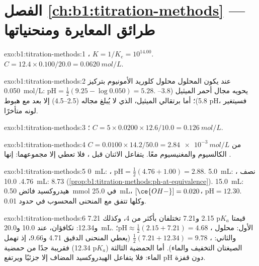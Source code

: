 \section*{الفصل \ref{ch:b1:titration-methods} --- طرائق المعايرة ومنحنياتها}

\begin{solution}{exo:b1:titration-methods:1}
، $K = 1/K_e = 10^{14.00}$. $C = 12.4 \times
0.100/20.0 = \qty{0.0620}{mol/L}$.
\end{solution}

\begin{solution}{exo:b1:titration-methods:2}
عند  يكون المحلول محلول كلوريد الأمونيوم بتركيز
\qty{0.050}{mol/L}: $\mathrm{pH} = \frac12(9.25 - \log 0.050) = 5.28$.
يحويه مجال أحمر الميثيل (3.8--5.8)؛ أما برتقالي الميثيل، الذي لا يُبلغ مجاله (2.5--4.5) إلا بعد  مع هبوط pH، فسيتغير لونه متأخرًا.
\end{solution}

\begin{solution}{exo:b1:titration-methods:3}
؛
$C = 5 \times 0.0200 \times 12.6/10.0 = \qty{0.126}{mol/L}$.
\end{solution}

\begin{solution}{exo:b1:titration-methods:4}
$C = 0.0100 \times 14.2/50.0 = \qty{2.84e-3}{mol/L}$ من الكالسيوم
والمغنيسيوم معًا. يتفاعل الاثنان قبل ، فلا تعطي إلا مجموعهما:
إنها .
\end{solution}

\begin{solution}{exo:b1:titration-methods:5}
0~mL: ، $\mathrm{pH} = \frac12(4.76 + 1.00) = 2.88$. 5.0~mL:
نصف ، 4.76. 10.0~mL: 8.73
(\cref{prop:b1:titration-methods:ph-at-equivalence}). 15.0~mL: هيدروكسيد
فائض \qty{0.50}{mmol} في \qty{25.0}{mL}، $[\ce{OH-}] = 0.020$،
$\mathrm{pH} = 12.30$. وكلها تتفق مع المنحنى المحسوب في حدود 0.01.
\end{solution}

\begin{solution}{exo:b1:titration-methods:6}
قيمتا $\mathrm{p}K_a$ 2.15 و7.21 تختلفان بأكثر من 4، وكذلك 7.21
و12.34: تكافؤان، عند 10.0 و\qty{20.0}{mL}. الأول: محلول
، $\mathrm{pH} \approx \frac12(2.15 + 7.21) = 4.68$؛ والثاني:
، $\frac12(7.21 + 12.34) = 9.78$ (يعطي المنحنى الدقيق 4.71
و9.66، إذ تهمل الصيغتان التخفيف والماء). أما الحمضية الثالثة
($\mathrm{p}K_a$ 12.34) فقريبة جدًا من حمضية الماء: فلا يتفاعل الهيدروكسيد المضاف
إلا جزئيًا ويرتفع pH دون قفزة.
\end{solution}

